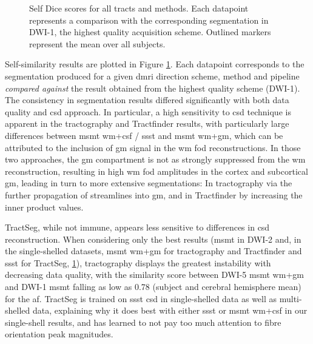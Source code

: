 
\begin{figure}
  \centering
  
  \caption[Self-similarity scores for data stability analysis]{Self Dice scores for all tracts and methods. Each datapoint represents a comparison with the corresponding segmentation in DWI-1, the highest quality acquisition scheme. Outlined markers represent the mean over all subjects.}
  \label{fig:self_dice}
\end{figure}

Self-similarity results are plotted in Figure \ref{fig:self_dice}.
Each datapoint corresponds to the segmentation produced for a given \gls{dmri} direction scheme, method and pipeline \textit{compared against} the result obtained from the highest quality scheme (DWI-1).
The consistency in segmentation results differed significantly with both data quality and \gls{csd} approach.
In particular, a high sensitivity to \gls{csd} technique is apparent in the tractography and Tractfinder results, with particularly large differences between \gls{msmt} \gls{wm}+\gls{csf} / \gls{ssst} and \gls{msmt} \gls{wm}+\gls{gm}, which can be attributed to the inclusion of \gls{gm} signal in the \gls{wm} \gls{fod} reconstructions.
In those two approaches, the \gls{gm} compartment is not as strongly suppressed from the \gls{wm} reconstruction, resulting in high \gls{wm} \gls{fod} amplitudes in the cortex and subcortical \gls{gm}, leading in turn to more extensive segmentations:
In tractography via the further propagation of streamlines into \gls{gm}, and in Tractfinder by increasing the inner product values.

TractSeg, while not immune, appears less sensitive to differences in \gls{csd} reconstruction.
When considering only the best results (\gls{msmt} in DWI-2 and, in the single-shelled datasets, \gls{msmt} \gls{wm}+\gls{gm} for tractography and Tractfinder and \gls{ssst} for TractSeg, \ref{fig:self_dice}), tractography displays the greatest instability with decreasing data quality, with the similarity score between DWI-5 \gls{msmt} \gls{wm}+\gls{gm} and DWI-1 \gls{msmt} falling as low as 0.78 (subject and cerebral hemisphere mean) for the \gls{af}.
TractSeg is trained on \gls{ssst} \gls{csd} in single-shelled data as well as multi-shelled data, explaining why it does best with either \gls{ssst} or \gls{msmt} \gls{wm}+\gls{csf} in our single-shell results, and has learned to not pay too much attention to fibre orientation peak magnitudes.

